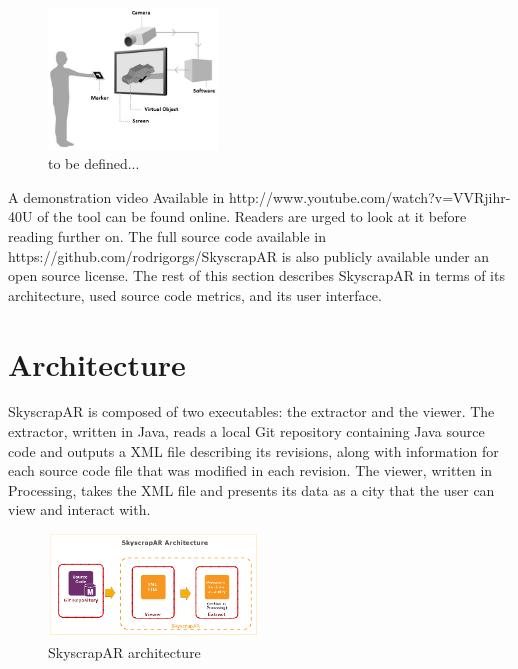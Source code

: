 \begin{figure}[h!]
 \centering
 \includegraphics[width=0.4\textwidth, bb=0 0 486 406]{./images/howtowork.jpg}
 \caption{to be defined...}
 \label{fig:toBeDefined}
\end{figure}

A demonstration video Available in http://www.youtube.com/watch?v=VVRjihr-40U of the tool can be found online. Readers are urged to look at it before reading further on. The full source code available in https://github.com/rodrigorgs/SkyscrapAR is also publicly available under an open source license. The rest of this section describes SkyscrapAR in terms of its architecture, used source code metrics, and its user interface.

\section{Architecture} \label{sec:architecture}
SkyscrapAR is composed of two executables: the extractor and the viewer. The extractor, written in Java, reads a local Git repository containing Java source code and outputs a XML file describing its revisions, along with information for each source code file that was modified in each revision. The viewer, written in Processing, takes the XML file and presents its data as a city that the user can view and interact with.

\begin{figure}[ht!]
 \centering
 \includegraphics[width=0.5\textwidth, bb=0 0 547 269]{./images/architecture.png}
 \caption{SkyscrapAR architecture}
 \label{fig:architecture}
\end{figure}

